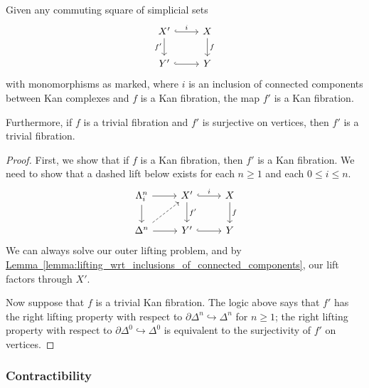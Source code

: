\documentclass[main.tex]{subfiles}
\begin{document}
\begin{corollary}
  \label{cor:connected_components_kan_fibration}
  Given any commuting square of simplicial sets
  \begin{equation*}
    \begin{tikzcd}
      X'
      \arrow[r, hook, "i"]
      \arrow[d, swap, "f'"]
      & X
      \arrow[d, "f"]
      \\
      Y'
      \arrow[r, hook]
      & Y
    \end{tikzcd}
  \end{equation*}
  with monomorphisms as marked, where $i$ is an inclusion of connected components between Kan complexes and $f$ is a Kan fibration, the map $f'$ is a Kan fibration.

  Furthermore, if $f$ is a trivial fibration and $f'$ is surjective on vertices, then $f'$ is a trivial fibration.
\end{corollary}
\begin{proof}
  First, we show that if $f$ is a Kan fibration, then $f'$ is a Kan fibration. We need to show that a dashed lift below exists for each $n \geq 1$ and each $0 \leq i \leq n$.
  \begin{equation*}
    \begin{tikzcd}
      \Lambda^{n}_{i}
      \arrow[r]
      \arrow[d]
      & X'
      \arrow[r, hook, "i"]
      \arrow[d, "f'"]
      & X
      \arrow[d, "f"]
      \\
      \Delta^{n}
      \arrow[r]
      \arrow[ur, dashed]
      & Y'
      \arrow[r, hook]
      & Y
    \end{tikzcd}
  \end{equation*}
  We can always solve our outer lifting problem, and by \hyperref[lemma:lifting_wrt_inclusions_of_connected_components]{Lemma~\ref*{lemma:lifting_wrt_inclusions_of_connected_components}}, our lift factors through $X'$.

  Now suppose that $f$ is a trivial Kan fibration. The logic above says that $f'$ has the right lifting property with respect to $\partial \Delta^{n} \hookrightarrow \Delta^{n}$ for $n \geq 1$; the right lifting property with respect to $\partial \Delta^{0} \hookrightarrow \Delta^{0}$ is equivalent to the surjectivity of $f'$ on vertices.
\end{proof}

\subsubsection*{Contractibility}
\end{document}
